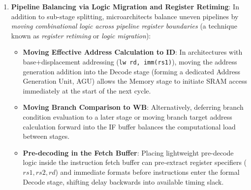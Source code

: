 \begin{enumerate}
\begin{itemize}
\begin{itemize}
        \end{itemize}
        \item \textbf{Stage 4: Memory Access and Write-Back (MEM/WB)} is partitioned into:
        \begin{itemize}
            \item \textbf{MEM (Data Memory Access)}: Synchronous read/write access to the data SRAM array ($0.30\,\text{ns}$).
            \item \textbf{WB (Write-Back Commit)}: Write-back multiplexing and synchronous commit into the architectural register file ($0.25\,\text{ns}$).
        \end{itemize}
    \end{itemize}
    In ASAP7 7\,nm FinFET technology, this 8-stage superpipelined organization achieves an operating clock period of under $0.30\,\text{ns}$, unlocking operating clock frequencies exceeding \textit{3.3\,GHz}.
    
    \item \textbf{Pipeline Balancing via Logic Migration and Register Retiming}:
    In addition to sub-stage splitting, microarchitects balance uneven pipelines by \textit{moving combinational logic across pipeline register boundaries} (a technique known as \textit{register retiming} or \textit{logic migration}):
    \begin{itemize}
        \item \textbf{Moving Effective Address Calculation to ID}: In architectures with base+displacement addressing (\texttt{lw rd, imm(rs1)}), moving the address generation addition into the Decode stage (forming a dedicated Address Generation Unit, AGU) allows the Memory stage to initiate SRAM access immediately at the start of the next cycle.
        \item \textbf{Moving Branch Comparison to WB}: Alternatively, deferring branch condition evaluation to a later stage or moving branch target address calculation forward into the IF buffer balances the computational load between stages.
        \item \textbf{Pre-decoding in the Fetch Buffer}: Placing lightweight pre-decode logic inside the instruction fetch buffer can pre-extract register specifiers ($rs1, rs2, rd$) and immediate formats before instructions enter the formal Decode stage, shifting delay backwards into available timing slack.
    \end{itemize}
\end{enumerate}



